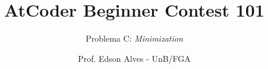 \title{AtCoder Beginner Contest 101}
\subtitle{Problema C: {\it Minimization}}
\author{Prof. Edson Alves - UnB/FGA}
\date{}
